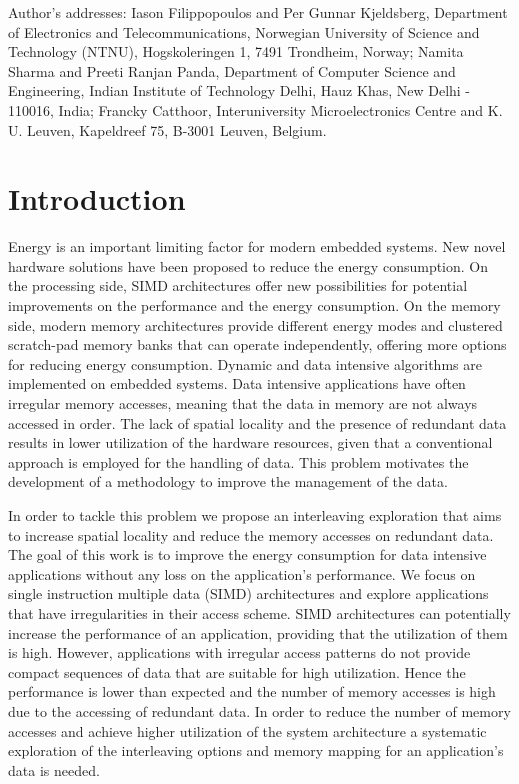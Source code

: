 \documentclass[prodmode,acmtecs]{acmsmall}
\begin{document}
\begin{bottomstuff}
Author's addresses: Iason Filippopoulos {and} Per Gunnar Kjeldsberg, Department of Electronics and Telecommunications, Norwegian University of Science and Technology (NTNU), Hogskoleringen 1, 7491 Trondheim, Norway; Namita Sharma  {and} Preeti Ranjan Panda, Department of Computer Science and Engineering, Indian Institute of Technology Delhi, Hauz Khas, New Delhi - 110016, India; Francky Catthoor, Interuniversity Microelectronics Centre and K. U. Leuven, Kapeldreef 75, B-3001 Leuven, Belgium.
\end{bottomstuff}



\maketitle

\section{Introduction}

Energy is an important limiting factor for modern embedded systems.
New novel hardware solutions have been proposed to reduce the energy consumption.
On the processing side, SIMD architectures offer new possibilities for potential improvements on the performance and the energy consumption.
On the memory side, modern memory architectures provide different energy modes and clustered scratch-pad memory banks that can operate independently, offering more options for reducing energy consumption.
Dynamic and data intensive algorithms are implemented on embedded systems.
Data intensive applications have often irregular memory accesses, meaning that the data in memory are not always accessed in order.
The lack of spatial locality and the presence of redundant data results in lower utilization of the hardware resources, given that a conventional approach is employed for the handling of data.
This problem motivates the development of a methodology to improve the management of the data.

In order to tackle this problem we propose an interleaving exploration that aims to increase spatial locality and reduce the memory accesses on redundant data.
The goal of this work is to improve the energy consumption for data intensive applications without any loss on the application's performance. 
We focus on single instruction multiple data (SIMD) architectures and explore applications that have irregularities in their access scheme. 
SIMD architectures can potentially increase the performance of an application, providing that the utilization of them is high. 
However, applications with irregular access patterns do not provide compact sequences of data that are suitable for high utilization. 
Hence the performance is lower than expected and the number of memory accesses is high due to the accessing of redundant data. 
In order to reduce the number of memory accesses and achieve higher utilization of the system architecture a systematic exploration of the interleaving options and memory mapping for an application's data is needed. 
\end{document}
